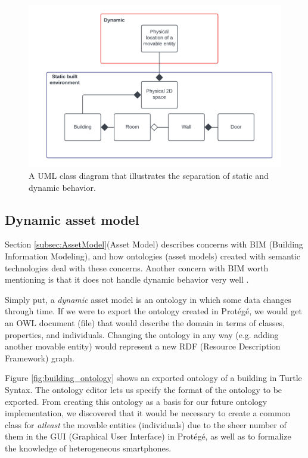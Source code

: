 \documentclass{article}
\begin{document}
\begin{figure}[H]
    \centering
    \includegraphics[scale=0.16]{graphics/static_built_environment.png}
    \caption{A UML class diagram that illustrates the separation of static and dynamic behavior.}
    \label{fig:static_built_environment}
\end{figure}


\subsection{Dynamic asset model}\label{subsubsec:DynamicAssetModel}
Section \ref{subsec:AssetModel}(Asset Model) describes concerns with BIM (Building Information Modeling), and how ontologies (asset models) created with semantic technologies deal with these concerns. Another concern with BIM worth mentioning is that it does not handle dynamic behavior very well \cite{kamburjan_digital_2022}.

Simply put, a \emph{dynamic} asset model is an ontology in which some data changes through time. If we were to export the ontology created in Protégé, we would get an OWL document (file) that would describe the domain in terms of classes, properties, and individuals. Changing the ontology in any way (e.g. adding another movable entity) would represent a new RDF (Resource Description Framework) graph.

Figure \ref{fig:building_ontology} shows an exported ontology of a building in Turtle Syntax. The ontology editor lets us specify the format of the ontology to be exported. From creating this ontology as a basis for our future ontology implementation, we discovered that it would be necessary to create a common class for \emph{atleast} the movable entities (individuals) due to the sheer number of them in the GUI (Graphical User Interface) in Protégé, as well as to formalize the knowledge of heterogeneous smartphones.
\end{document}
